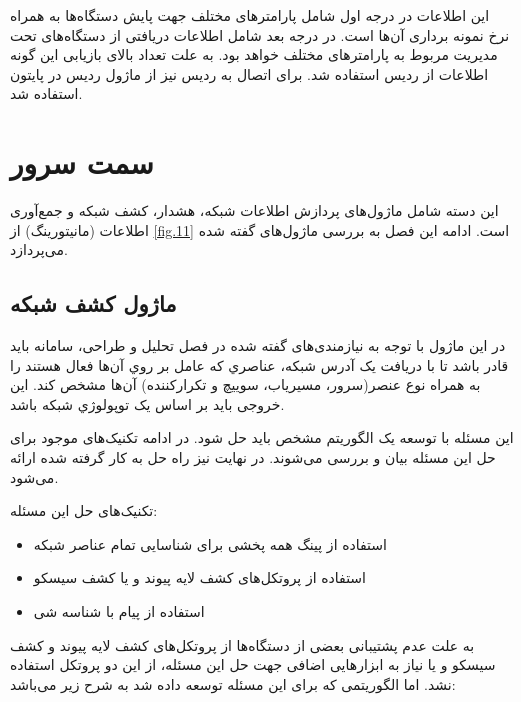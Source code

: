 این اطلاعات در درجه اول شامل پارامتر‌های مختلف جهت پایش دستگاه‌ها به همراه نرخ نمونه برداری آن‌ها است. در درجه بعد شامل اطلاعات دریافتی از دستگاه‌های تحت مدیریت مربوط به پارامترهای مختلف خواهد بود. به علت تعداد بالای بازیابی این گونه اطلاعات از ردیس استفاده شد. برای اتصال به ردیس نیز از ماژول ردیس در پایتون استفاده شد.

\newpage

\section{سمت سرور}

این دسته شامل ماژول‌های پردازش اطلاعات شبکه، هشدار، کشف شبکه و جمع‌آوری اطلاعات (مانیتورینگ) از \cref{fig.11} است. ادامه این فصل به بررسی ماژول‌های گفته شده می‌پردازد.


\subsection{ماژول کشف شبکه}

در این ماژول با توجه به نیازمندی‌های گفته شده در فصل تحلیل و طراحی، سامانه باید قادر باشد تا با دریافت یک آدرس شبکه، عناصري که عامل  بر روي آن‌ها فعال هستند را به همراه نوع عنصر(سرور، مسیریاب، سوییچ و تکرارکننده) آن‌ها مشخص کند. این خروجی باید بر اساس یک توپولوژي شبکه باشد.


این مسئله با توسعه یک الگوریتم مشخص باید حل شود. در ادامه تکنیک‌های موجود برای حل این مسئله بیان و بررسی می‌شوند. در نهایت نیز راه حل به کار گرفته شده ارائه می‌شود.

تکنیک‌های حل این مسئله:

\begin{itemize}
    \item استفاده از پینگ همه پخشی برای شناسایی تمام عناصر شبکه
    \item استفاده از پروتکل‌های کشف لایه پیوند و یا کشف سیسکو
    \item استفاده از پیام  با شناسه شی 
\end{itemize}

به علت عدم پشتیبانی بعضی از دستگاه‌ها از پروتکل‌های کشف لایه پیوند و کشف سیسکو و یا نیاز به ابزارهایی اضافی جهت حل این مسئله، از این دو پروتکل استفاده نشد. اما الگوریتمی که برای این مسئله توسعه داده شد به شرح زیر می‌باشد:

